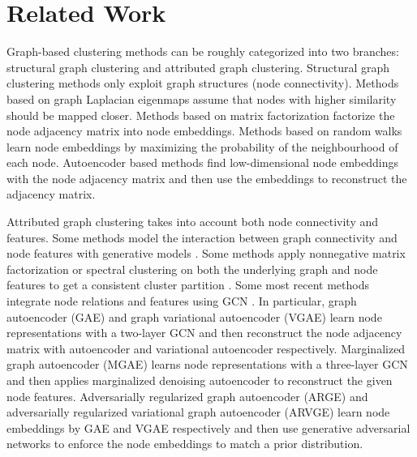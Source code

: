 \documentclass{article}
\begin{document}
 
\section{Related Work}

Graph-based clustering methods can be roughly categorized into two branches: structural graph clustering and attributed graph clustering. Structural graph clustering methods only exploit graph structures (node connectivity). Methods based on graph Laplacian eigenmaps \cite{newman2006finding} assume that nodes with higher similarity should be mapped closer. Methods based on matrix factorization \cite{cao2015grarep,nikolentzos2017matching} factorize the node adjacency matrix into node embeddings. Methods based on random walks \cite{perozzi2014deepwalk,grover2016node2vec} learn node embeddings by maximizing the probability of the neighbourhood of each node. Autoencoder based methods \cite{wang2016structural,cao2016deep,ye2018deep} find low-dimensional node embeddings with the node adjacency matrix and then use the embeddings to reconstruct the adjacency matrix.

Attributed graph clustering \cite{yang2009combining} takes into account both node connectivity and features. Some methods model the interaction between graph connectivity and node features with generative models \cite{chang2009relational,yang2013community,he2017joint,bojchevski2018bayesian}. Some methods apply nonnegative matrix factorization or spectral clustering on both the underlying graph and node features to get a consistent cluster partition \cite{xia2014robust,wang2016semantic,li2018community,yang2015network}. Some most recent methods integrate node relations and features using GCN \cite{kipf2016semi}. In particular, graph autoencoder (GAE) and graph variational autoencoder (VGAE) \cite{kipf2016variational} learn node representations with a two-layer GCN and then reconstruct the node adjacency matrix with autoencoder and variational autoencoder respectively. Marginalized graph autoencoder (MGAE) \cite{wang2017mgae} learns node representations with a three-layer GCN and then applies marginalized denoising autoencoder to reconstruct the given node features. Adversarially regularized graph autoencoder (ARGE) and adversarially regularized variational graph autoencoder (ARVGE) \cite{pan2018adversarially} learn node embeddings by GAE and VGAE respectively and then use generative adversarial networks to enforce the node embeddings to match a prior distribution.
\end{document}

